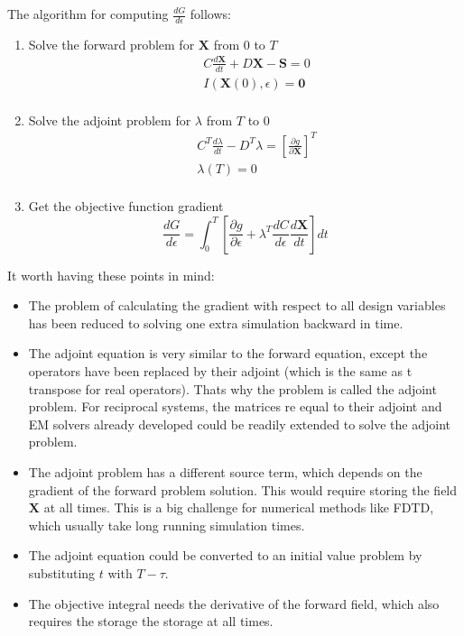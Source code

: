 \documentclass{tufte-handout}
\begin{document}
The algorithm for computing $ \frac{d G}{d\epsilon}$ follows:
\begin{enumerate}
	\item Solve the forward problem for $\mathbf{X}$ from $0$ to $T$
	\begin{equation*}
	\begin{aligned}
 \quad & C \frac{d \mathbf{X}}{dt} + D \mathbf{X} - \mathbf{S} = 0\\
	&I(\mathbf{X}(0),\epsilon) = \mathbf{0}   \\
	\end{aligned}
	\end{equation*}
	\item Solve the adjoint problem for $\lambda$ from $T$ to $0$
	\begin{equation*}
	\begin{aligned}
	\quad & C^T \frac{d \lambda }{dt} - D^T \lambda = \left[ \frac{\partial g}{\partial \mathbf{X}}\right]^T \\
	&\lambda(T) = 0   \\
	\end{aligned}
	\end{equation*}
	\item Get the objective function gradient
	  \begin{equation}\label{lag_graddd}
	  \frac{d G}{d\epsilon} = \int_{0}^{T} \left[  \frac{\partial g}{\partial \epsilon} + \lambda^T \frac{d C}{d \epsilon} \frac{d \mathbf{X}}{dt}  \right] dt 
	  \end{equation}
\end{enumerate}
It worth having these points in mind:

\begin{itemize}
	\item The problem of calculating the gradient with respect to all design variables has been reduced  to solving one extra simulation backward in time.
	\item The adjoint equation is very similar to the forward equation, except the operators have been replaced by their adjoint (which is the same as t transpose for real operators). Thats why the problem is called the adjoint problem. For reciprocal systems, the matrices re equal to their adjoint and EM solvers already developed could be readily extended to solve the adjoint problem. 
	\item The adjoint problem has a different source term, which depends on the gradient of the forward problem solution. This would require storing the field $\mathbf{X}$ at all times. This is a big challenge for numerical methods like FDTD, which usually take long running simulation times.  
	\item The adjoint equation  could be converted to an initial value problem by substituting $t$ with $T-\tau$. 
	\item The objective integral needs the derivative of the forward field, which also requires the storage the storage  at all times.
\end{itemize}
\end{document}

